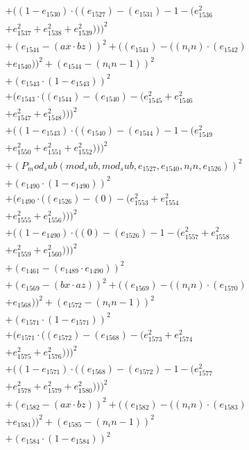 \documentclass[10pt, a4paper]{article}
\begin{document}
\begin{small}
\begin{align*}
& + ((1 - e_{1530})  \cdot  ((e_{1527}) - (e_{1531}) - 1 - (e_{1536}^{2} \\
& + e_{1537}^{2} + e_{1538}^{2} + e_{1539}^{2})))^{2} \\
& + (e_{1541} - (ax  \cdot  bz))^{2} + ((e_{1541}) - ((n_in)  \cdot  (e_{1542}) \\
& + e_{1540}))^{2} + (e_{1544} - (n_in - 1))^{2} \\
& + (e_{1543}  \cdot  (1 - e_{1543}))^{2} \\
& + (e_{1543}  \cdot  ((e_{1544}) - (e_{1540}) - (e_{1545}^{2} + e_{1546}^{2} \\
& + e_{1547}^{2} + e_{1548}^{2})))^{2} \\
& + ((1 - e_{1543})  \cdot  ((e_{1540}) - (e_{1544}) - 1 - (e_{1549}^{2} \\
& + e_{1550}^{2} + e_{1551}^{2} + e_{1552}^{2})))^{2} \\
& + (P_mod_sub(mod_sub, mod_sub, e_{1527}, e_{1540}, n_in, e_{1526}))^{2} \\
& + (e_{1490}  \cdot  (1 - e_{1490}))^{2} \\
& + (e_{1490}  \cdot  ((e_{1526}) - (0) - (e_{1553}^{2} + e_{1554}^{2} \\
& + e_{1555}^{2} + e_{1556}^{2})))^{2} \\
& + ((1 - e_{1490})  \cdot  ((0) - (e_{1526}) - 1 - (e_{1557}^{2} + e_{1558}^{2} \\
& + e_{1559}^{2} + e_{1560}^{2})))^{2} \\
& + (e_{1461} - (e_{1489}  \cdot  e_{1490}))^{2} \\
& + (e_{1569} - (bx  \cdot  az))^{2} + ((e_{1569}) - ((n_in)  \cdot  (e_{1570}) \\
& + e_{1568}))^{2} + (e_{1572} - (n_in - 1))^{2} \\
& + (e_{1571}  \cdot  (1 - e_{1571}))^{2} \\
& + (e_{1571}  \cdot  ((e_{1572}) - (e_{1568}) - (e_{1573}^{2} + e_{1574}^{2} \\
& + e_{1575}^{2} + e_{1576}^{2})))^{2} \\
& + ((1 - e_{1571})  \cdot  ((e_{1568}) - (e_{1572}) - 1 - (e_{1577}^{2} \\
& + e_{1578}^{2} + e_{1579}^{2} + e_{1580}^{2})))^{2} \\
& + (e_{1582} - (ax  \cdot  bz))^{2} + ((e_{1582}) - ((n_in)  \cdot  (e_{1583}) \\
& + e_{1581}))^{2} + (e_{1585} - (n_in - 1))^{2} \\
& + (e_{1584}  \cdot  (1 - e_{1584}))^{2} \\

\end{align*}
\end{small}
\end{document}

